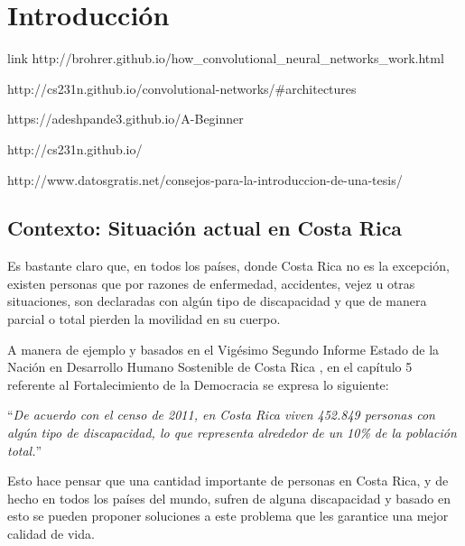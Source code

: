 
\chapter{Introducción}
\label{chp:intro}




link http://brohrer.github.io/how_convolutional_neural_networks_work.html

http://cs231n.github.io/convolutional-networks/#architectures


https://adeshpande3.github.io/A-Beginner%



http://cs231n.github.io/

http://www.datosgratis.net/consejos-para-la-introduccion-de-una-tesis/



\section{Contexto: Situación actual en Costa Rica}
Es bastante claro que, en todos los países, donde Costa Rica no es la excepción, existen personas que por razones de 
enfermedad, accidentes, vejez u otras situaciones, son declaradas con algún tipo de discapacidad y que de
manera parcial o total pierden la movilidad en su cuerpo. 

A manera de ejemplo y basados en el Vigésimo Segundo Informe Estado de la Nación en Desarrollo Humano Sostenible de 
Costa Rica \cite{estadonacion1}, en el capítulo 5 referente al Fortalecimiento de la Democracia se expresa lo siguiente: 

\begin{center}
“\textit{De acuerdo con el censo de 2011, en Costa Rica viven 452.849 personas con algún tipo de discapacidad, lo que
representa alrededor de un 10\% de la población total.}”

\end{center}
Esto hace pensar que una cantidad importante de personas en Costa Rica, y de hecho en todos los países del mundo, 
sufren de alguna discapacidad y basado en esto se pueden proponer soluciones a este problema que les garantice 
una mejor calidad de vida. 



